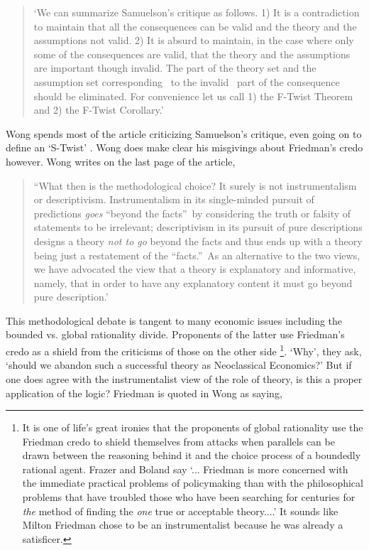 \documentclass{ucthesis}
\begin{document}
\begin{quotation}
`We can summarize Samuelson's critique as follows. 1) It is a contradiction
to maintain that all the consequences can be valid and the theory and the
assumptions not valid. 2) It is absurd to maintain, in the case where only
some of the consequences are valid, that the theory and the assumptions are
important though invalid. The part of the theory set and the assumption set
corresponding \ to the invalid \ part of the consequence should be
eliminated. For convenience let us call 1) the F-Twist Theorem and 2) the
F-Twist Corollary.' \cite[pp. 314]{wong 1973}
\end{quotation}

Wong spends most of the article criticizing Samuelson's critique, even going
on to define an `S-Twist' \cite[pp. 316]{wong 1973}. Wong does make clear
his misgivings about Friedman's credo however. Wong writes on the last page
of the article,

\begin{quotation}
\textquotedblleft What then is the methodological choice? It surely is not
instrumentalism or descriptivism. Instrumentalism in its single-minded
pursuit of predictions \textit{goes} \textquotedblleft beyond the
facts\textquotedblright\ by considering the truth or falsity of statements
to be irrelevant; descriptivism in its pursuit of pure descriptions designs
a theory \textit{not to go} beyond the facts and thus ends up with a theory
being just a restatement of the \textquotedblleft facts.\textquotedblright\
As an alternative to the two views, we have advocated the view that a theory
is explanatory and informative, namely, that in order to have any
explanatory content it must go beyond pure description.' \cite[pp. 324]{wong
1973}
\end{quotation}

This methodological debate is tangent to many economic issues including the
bounded vs. global rationality divide. Proponents of the latter use
Friedman's credo as a shield from the criticisms of those on the other side 
\footnote{%
It is one of life's great ironies that the proponents of global rationality
use the Friedman credo to shield themselves from attacks when parallels can
be drawn between the reasoning behind it and the choice process of a
boundedly rational agent. Frazer and Boland \cite[1983]{boland 1983} say
`... Friedman is more concerned with the immediate practical problems of
policymaking than with the philosophical problems that have troubled those
who have been searching for centuries for \textit{the} method of finding the 
\textit{one} true or acceptable theory....'\cite[pp. 131]{boland 1983} It
sounds like Milton Friedman chose to be an instrumentalist because he was
already a satisficer.}. `Why', they ask, `should we abandon such a
successful theory as Neoclassical Economics?' But if one does agree with the
instrumentalist view of the role of theory, is this a proper application of
the logic? Friedman is quoted in Wong \cite[pp. 315]{wong 1973} as saying,
\end{document}
